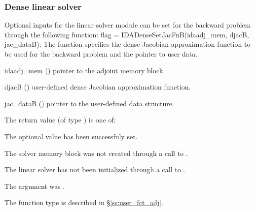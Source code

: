 \subsubsection{Dense linear solver}
Optional inputs for the {\idadense} linear solver module can be set for the backward
problem through the following function:
{
  flag = IDADenseSetJacFnB(idaadj\_mem, djacB, jac\_dataB);
}
{
  The function  specifies the dense Jacobian
  approximation function to be used for the backward problem and the
  pointer to user data.
}
{
  \begin{args}
  \item[idaadj\_mem] ()
    pointer to the adjoint memory block.
  \item[djacB] ()
    user-defined dense Jacobian approximation function.
  \item[jac\_dataB] ()
    pointer to the user-defined data structure.
  \end{args}
}
{
  The return value  (of type ) is one of:
  \begin{args}
  \item[\Id{IDADENSE\_SUCCESS}] 
    The optional value has been successfuly set.
  \item[\Id{IDADENSE\_MEM\_NULL}]
    The {\idas} solver memory block was not created through a call to .
  \item[\Id{IDADENSE\_LMEM\_NULL}]
    The {\idadense} linear solver has not been initialized through a call to .
  \item[\Id{IDADENSE\_ADJMEM\_NULL}]
    The  argument was .
  \end{args}
}
{
  The function type  is described in \S\ref{ss:user_fct_adj}.
}


